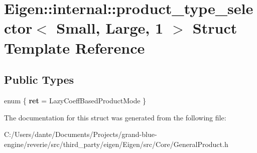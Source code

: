 \hypertarget{struct_eigen_1_1internal_1_1product__type__selector_3_01_small_00_01_large_00_011_01_4}{}\section{Eigen\+::internal\+::product\+\_\+type\+\_\+selector$<$ Small, Large, 1 $>$ Struct Template Reference}
\label{struct_eigen_1_1internal_1_1product__type__selector_3_01_small_00_01_large_00_011_01_4}
\subsection*{Public Types}
\begin{DoxyCompactItemize}
\item 
\mbox{\label{struct_eigen_1_1internal_1_1product__type__selector_3_01_small_00_01_large_00_011_01_4_a6603376f81c4845562ac6ef108a65de5}} 
enum \{ {\bfseries ret} = Lazy\+Coeff\+Based\+Product\+Mode
 \}
\end{DoxyCompactItemize}


The documentation for this struct was generated from the following file\+:\begin{DoxyCompactItemize}
\item 
C\+:/\+Users/dante/\+Documents/\+Projects/grand-\/blue-\/engine/reverie/src/third\+\_\+party/eigen/\+Eigen/src/\+Core/General\+Product.\+h\end{DoxyCompactItemize}
